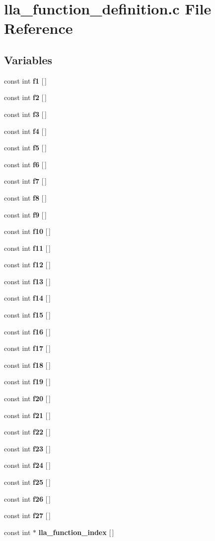 \section{lla\_\-function\_\-definition.c File Reference}
\label{lla__function__definition_8c}
\subsection*{Variables}
\begin{CompactItemize}
\item 
const int {\bf f1} [$\,$]
\item 
const int {\bf f2} [$\,$]
\item 
const int {\bf f3} [$\,$]
\item 
const int {\bf f4} [$\,$]
\item 
const int {\bf f5} [$\,$]
\item 
const int {\bf f6} [$\,$]
\item 
const int {\bf f7} [$\,$]
\item 
const int {\bf f8} [$\,$]
\item 
const int {\bf f9} [$\,$]
\item 
const int {\bf f10} [$\,$]
\item 
const int {\bf f11} [$\,$]
\item 
const int {\bf f12} [$\,$]
\item 
const int {\bf f13} [$\,$]
\item 
const int {\bf f14} [$\,$]
\item 
const int {\bf f15} [$\,$]
\item 
const int {\bf f16} [$\,$]
\item 
const int {\bf f17} [$\,$]
\item 
const int {\bf f18} [$\,$]
\item 
const int {\bf f19} [$\,$]
\item 
const int {\bf f20} [$\,$]
\item 
const int {\bf f21} [$\,$]
\item 
const int {\bf f22} [$\,$]
\item 
const int {\bf f23} [$\,$]
\item 
const int {\bf f24} [$\,$]
\item 
const int {\bf f25} [$\,$]
\item 
const int {\bf f26} [$\,$]
\item 
const int {\bf f27} [$\,$]
\item 
const int $\ast$ {\bf lla\_\-function\_\-index} [$\,$]
\end{CompactItemize}


